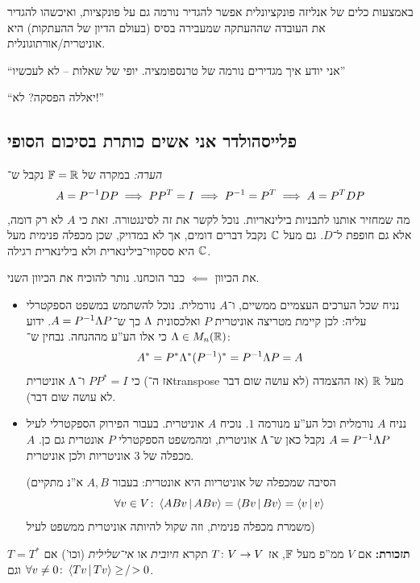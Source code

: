 \documentclass[]{../../../../tex/classes/styledArticle}
\begin{document}
	
	באמצעות כלים של אנליזה פונקציונלית אפשר להגדיר נורמה גם על פונקציות, ואיכשהו להגדיר את העובדה שההעתקה שמעבירה בסיס (בעולם הדיון של ההעתקות) היא אוניטרית/אורתוגונלית. 
	
	``אני יודע איך מגדירים נורמה של טרנספומציה. יופי של שאלות – לא לעכשיו''
	
	``יאללה הפסקה? לא!''
	
	\subsection{פלייסהולדר אני אשים כותרת בסיכום הסופי}
	\textit{הערה: }במקרה של $\mathbb{F}= \mathbb{R}$ נקבל ש־
	\[ A = P^{-1} DP \implies PP^T = I \implies P^{-1} = P^T \implies A = P^TDP \]
	מה שמחזיר אותנו לתבניות בילינאריות. נוכל לקשר את זה לסינגטורה. זאת כי $A$ לא רק דומה, אלא גם חופפת ל־$D$. גם מעל $\mathbb{C}$ נקבל דברים דומים, אך לא במדויק, שכן מכפלה פנימית מעל $\mathbb{C}$ היא ססקווי־בילינארית ולא בילינארית רגילה. 
	
	את הכיוון $\impliedby$ כבר הוכחנו. נותר להוכיח את הכיוון השני. 
	\begin{itemize}
		\item נניח שכל הערכים העצמיים ממשיים, ו־$A$ נורמלית. נוכל להשתמש במשפט הספקטרלי עליה: לכן קיימת מטריצה אוניטרית $P$ ואלכסונית $\Lambda$ כך ש־$A = P^{-1} \Lambda P$. ידוע $\Lambda \in M_n(\mathbb{R})$ כי אלו הע''ע מההנחה. נבחין ש־: 
		\[ A^* = P^* \Lambda^* (P^{-1})^* = P^{-1} \Lambda P = A \]
		כי $PP^* =I$ ו־$\Lambda$ אוניטרית (אז ה־transpose לא עושה שום דבר) מעל $\mathbb{R}$ (אז ההצמדה לא עושה שום דבר). 
		\item נניח $A$ נורמלית וכל הע''ע מנורמה $1$. נוכיח $A$ אוניטרית. בעבור הפירוק הספקטרלי לעיל $A = P^{-1} \Lambda P$ נקבל כאן ש־$\Lambda$ אוניטרית, ומהמשפט הספקטרלי $P$ אונטרית גם כן. $A$ מכפלה של 3 אוניטריות ולכן אוניטרית. 
		
		(הסיבה שמכפלה של אוניטריות היא אונטרית: בעבור $A, B$ א''נ מתקיים
		\[ \forall v \in V \colon \left \langle ABv \,\middle|\, ABv \right \rangle = \left \langle Bv \,\middle|\, Bv \right \rangle = \left \langle v \,\middle|\, v \right \rangle \]
		משמרת מכפלה פנימית, וזה שקול להיותה אוניטרית ממשפט לעיל)
	\end{itemize}
	
	\textbf{תזכורת: }אם $V$ ממ''פ מעל $\mathbb{F}$, אז $T \colon V \to V$ תקרא \textit{חיובית} או \textit{אי־שלילית} (וכו') אם $T = T^*$ וגם $\forall v \neq 0 \colon \left \langle Tv \,\middle|\, Tv \right \rangle \ge\!/\!> 0$. 
	
\end{document}
